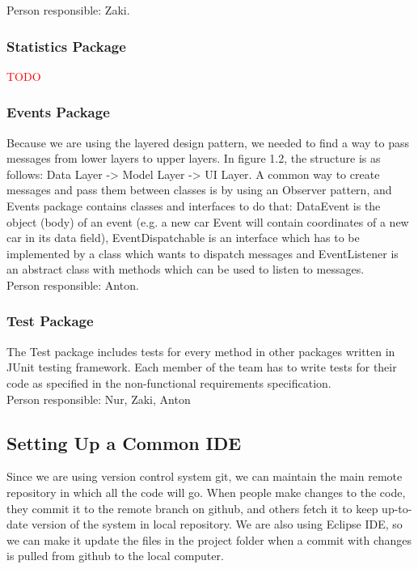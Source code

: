 \documentclass{article}
\begin{document}
\noindent
Person responsible: Zaki.

\subsubsection{Statistics Package}
\textcolor{red}{TODO}

\subsubsection{Events Package}
Because we are using the layered design pattern, we needed to find a way to pass messages from lower layers to upper layers. In figure 1.2, the structure is as follows: Data Layer -> Model Layer -> UI Layer. 
A common way to create messages and pass them between classes is by using an Observer pattern, and Events package contains classes and interfaces to do that: DataEvent is the object (body) of an event (e.g. a new car Event will contain coordinates of a new car in its data field), EventDispatchable is an interface which has to be implemented by a class which wants to dispatch messages and EventListener is an abstract class with methods which can be used to listen to messages.\\

\noindent
Person responsible: Anton.

\subsubsection{Test Package}
The Test package includes tests for every method in other packages written in JUnit testing framework. 
Each member of the team has to write  tests for their code as specified in the non-functional requirements specification.\\

\noindent
Person responsible: Nur, Zaki, Anton

\subsection{Setting Up a Common IDE}

Since we are using version control system git, we can maintain the main remote repository in which all the code will go. 
When people make changes to the code, they commit it to the remote branch on github, and others fetch it to keep up-to-date version of the system in local repository. 
We are also using Eclipse IDE, so we can make it update the files in the project folder when a commit with changes is pulled from github to the local computer.\\
\end{document}
